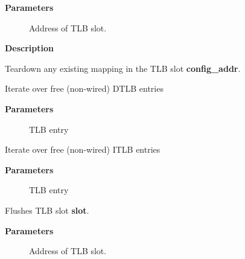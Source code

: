\documentclass[a4paper,8pt,english]{sphinxmanual}
\begin{document}
\textbf{Parameters}
\begin{description}
\item[{}] \leavevmode
Address of TLB slot.

\end{description}

\textbf{Description}

Teardown any existing mapping in the TLB slot \textbf{config\_addr}.

\begin{fulllineitems}
\label{sh/index:c.for_each_dtlb_entry}
Iterate over free (non-wired) DTLB entries

\end{fulllineitems}


\textbf{Parameters}
\begin{description}
\item[{}] \leavevmode
TLB entry

\end{description}

\begin{fulllineitems}
\label{sh/index:c.for_each_itlb_entry}
Iterate over free (non-wired) ITLB entries

\end{fulllineitems}


\textbf{Parameters}
\begin{description}
\item[{}] \leavevmode
TLB entry

\end{description}

\begin{fulllineitems}
\label{sh/index:c.__flush_tlb_slot}
Flushes TLB slot \textbf{slot}.

\end{fulllineitems}


\textbf{Parameters}
\begin{description}
\item[{}] \leavevmode
Address of TLB slot.

\end{description}
\end{document}
